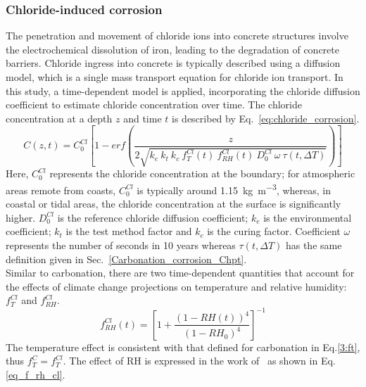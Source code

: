 \subsubsection{Chloride-induced corrosion}\label{Chloride_corrosion_Chpt}
The penetration and movement of chloride ions into concrete structures involve the electrochemical dissolution of iron, leading to the degradation of concrete barriers.
Chloride ingress into concrete is typically described using a diffusion model, which is a single mass transport equation for chloride ion transport.
In this study, a time-dependent model is applied, incorporating the chloride diffusion coefficient to estimate chloride concentration over time. The chloride concentration at a depth $z$ and time $t$ is described by Eq.~\ref{eq:chloride_corrosion}.
\begin{equation}
    \label{eq:chloride_corrosion}
    C(z, t) = C_0^{Cl} \left[ 1-erf \left(\frac{z}{2\sqrt{k_e \ k_t \ k_c \ f_T^{Cl}(t) \ f_{RH}^{Cl}(t) \ D_0^{Cl} \ \omega \ \tau(t, \Delta T)}} \right) \right]
\end{equation}
Here, $C_0^{Cl}$ represents the chloride concentration at the boundary; for atmospheric areas remote from coasts, $C_0^{Cl}$ is typically around \SI{1.15}{\kilogram\per\cubic\meter}, whereas, in coastal or tidal areas, the chloride concentration at the surface is significantly higher. $D_0^{Cl}$ is the reference chloride diffusion coefficient; $k_e$ is the environmental coefficient; $k_t$ is the test method factor and $k_c$ is the curing factor. 
Coefficient $\omega$ represents the number of seconds in 10 years whereas $\tau(t, \Delta T)$ has the same definition given in Sec.~\ref{Carbonation_corrosion_Chpt}.\\
Similar to carbonation, there are two time-dependent quantities that account for the effects of climate change projections on temperature and relative humidity: $f_{T}^{Cl}$ and $f_{RH}^{Cl}$.
\begin{equation}
    \label{eq_f_rh_cl}
    f_{RH}^{Cl}(t) = \left[ 1 + \frac{(1-RH(t))^4}{(1-RH_0)^4} \right]^{-1}
\end{equation}
The temperature effect is consistent with that defined for carbonation in Eq.\ref{3:ft}, thus $f_T^C = f_T^{Cl}$. The effect of RH is expressed in the work of~\textcite{f_RH_ClELHASSAN} as shown in Eq.\ref{eq_f_rh_cl}.

